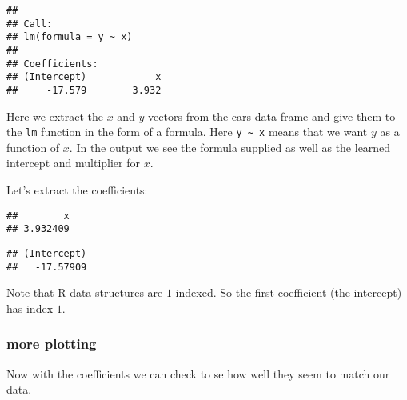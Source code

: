 \documentclass[]{article}
\newenvironment{Shaded}{\begin{snugshade}}{\end{snugshade}}
\newcommand{\KeywordTok}[1]{\textcolor[rgb]{0.13,0.29,0.53}{\textbf{#1}}}
\newcommand{\DataTypeTok}[1]{\textcolor[rgb]{0.13,0.29,0.53}{#1}}
\newcommand{\DecValTok}[1]{\textcolor[rgb]{0.00,0.00,0.81}{#1}}
\newcommand{\StringTok}[1]{\textcolor[rgb]{0.31,0.60,0.02}{#1}}
\newcommand{\OperatorTok}[1]{\textcolor[rgb]{0.81,0.36,0.00}{\textbf{#1}}}
\newcommand{\NormalTok}[1]{#1}
\begin{document}
\begin{verbatim}
## 
## Call:
## lm(formula = y ~ x)
## 
## Coefficients:
## (Intercept)            x  
##     -17.579        3.932
\end{verbatim}

Here we extract the \(x\) and \(y\) vectors from the cars data frame and
give them to the \texttt{lm} function in the form of a formula. Here
\texttt{y\ \textasciitilde{}\ x} means that we want \(y\) as a function
of \(x\). In the output we see the formula supplied as well as the
learned intercept and multiplier for \(x\).

Let's extract the coefficients:

\begin{Shaded}
\end{Shaded}

\begin{verbatim}
##        x 
## 3.932409
\end{verbatim}

\begin{Shaded}
\end{Shaded}

\begin{verbatim}
## (Intercept) 
##   -17.57909
\end{verbatim}

Note that R data structures are \(1\)-indexed. So the first coefficient
(the intercept) has index \(1\).

\subsubsection{more plotting}\label{more-plotting}

Now with the coefficients we can check to se how well they seem to match
our data.

\begin{Shaded}
\end{Shaded}
\end{document}
